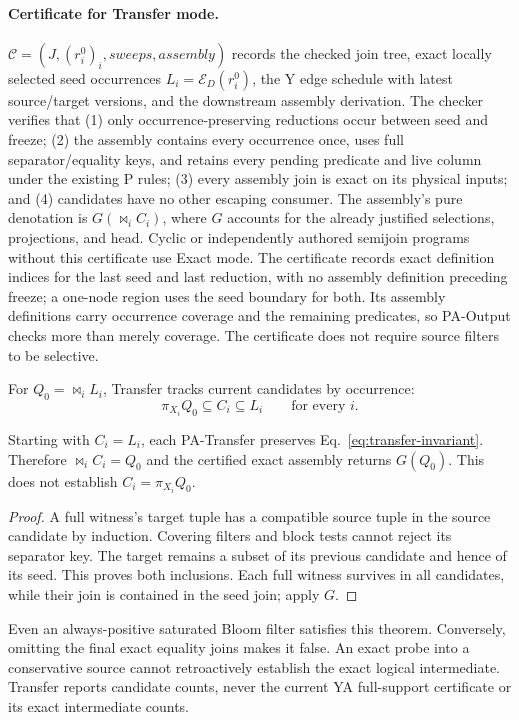 \paragraph{Certificate for Transfer mode.}
$\mathcal C=(J,(r_i^0)_i,\mathit{sweeps},\mathit{assembly})$ records the checked
join tree, exact locally selected seed occurrences $L_i=\mathcal E_D(r_i^0)$,
the Y edge schedule with latest source/target versions, and the downstream
assembly derivation. The checker verifies that (1) only occurrence-preserving
reductions occur between seed and freeze; (2) the assembly contains every
occurrence once, uses full separator/equality keys, and retains every pending
predicate and live column under the existing P rules; (3) every assembly join
is exact on its physical inputs; and (4) candidates have no other escaping
consumer. The assembly's pure denotation is $G(\bowtie_i C_i)$, where $G$
accounts for the already justified selections, projections, and head.
Cyclic or independently authored semijoin programs without this certificate
use Exact mode. The certificate records exact definition indices for the last seed and last
reduction, with no assembly definition preceding freeze; a one-node region
uses the seed boundary for both. Its assembly definitions carry occurrence
coverage and the remaining predicates, so PA-Output checks more than merely
coverage. The certificate does not require source filters to be selective.

For $Q_0=\bowtie_i L_i$, Transfer tracks current candidates by occurrence:
\begin{equation}\label{eq:transfer-invariant}
 \pi_{X_i}Q_0\subseteq C_i\subseteq L_i\qquad\text{for every }i.
\end{equation}
\begin{theorem}
Starting with $C_i=L_i$, each PA-Transfer preserves
Eq.~\eqref{eq:transfer-invariant}. Therefore
$\bowtie_i C_i=Q_0$ and the certified exact assembly returns $G(Q_0)$.
This does not establish $C_i=\pi_{X_i}Q_0$.
\end{theorem}
\begin{proof}
A full witness's target tuple has a compatible source tuple in the source
candidate by induction. Covering filters and block tests cannot reject its
separator key. The target remains a subset of its previous candidate and
hence of its seed. This proves both inclusions. Each full witness survives in
all candidates, while their join is contained in the seed join; apply $G$.
\end{proof}
Even an always-positive saturated Bloom filter satisfies this theorem.
Conversely, omitting the final exact equality joins makes it false. An exact
probe into a conservative source cannot retroactively establish the exact
logical intermediate. Transfer reports candidate counts, never the current
YA full-support certificate or its exact intermediate counts.

